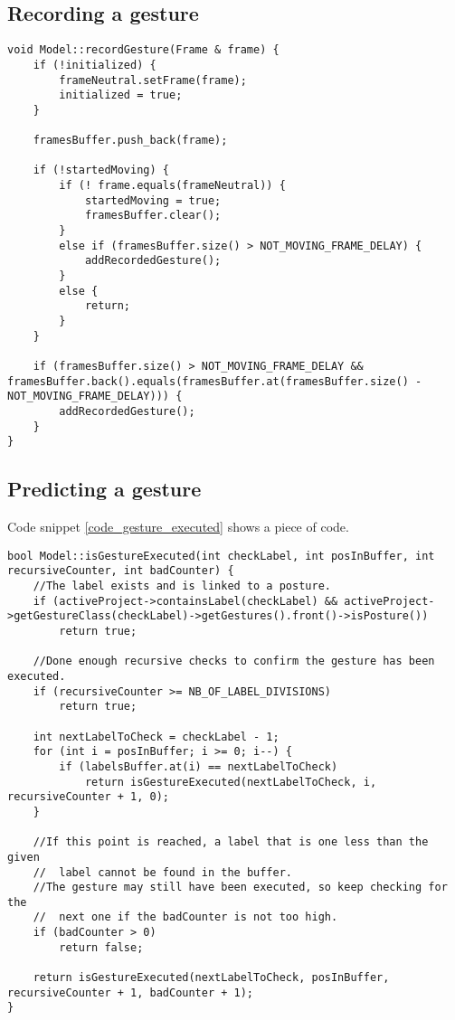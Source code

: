 \subsection{Recording a gesture}

\begin{lstlisting}[caption=method to record a gesture, label=code_record_gesture]
void Model::recordGesture(Frame & frame) {
	if (!initialized) {
		frameNeutral.setFrame(frame);
		initialized = true;
	}
	
	framesBuffer.push_back(frame);

	if (!startedMoving) {
		if (! frame.equals(frameNeutral)) {
			startedMoving = true;
			framesBuffer.clear();
		}
		else if (framesBuffer.size() > NOT_MOVING_FRAME_DELAY) {
			addRecordedGesture();
		}
		else {
			return;
		}
	}

	if (framesBuffer.size() > NOT_MOVING_FRAME_DELAY &&	framesBuffer.back().equals(framesBuffer.at(framesBuffer.size() - NOT_MOVING_FRAME_DELAY))) {
		addRecordedGesture();
	}
}
\end{lstlisting}


\subsection{Predicting a gesture}

Code snippet \ref{code_gesture_executed} shows a piece of code.

\begin{lstlisting}[caption=method to verify if a gesture with given label is executed, label=code_gesture_executed]
bool Model::isGestureExecuted(int checkLabel, int posInBuffer, int recursiveCounter, int badCounter) {
	//The label exists and is linked to a posture.
	if (activeProject->containsLabel(checkLabel) && activeProject->getGestureClass(checkLabel)->getGestures().front()->isPosture())
		return true;

	//Done enough recursive checks to confirm the gesture has been executed.
	if (recursiveCounter >= NB_OF_LABEL_DIVISIONS)
		return true;

	int nextLabelToCheck = checkLabel - 1;
	for (int i = posInBuffer; i >= 0; i--) {
		if (labelsBuffer.at(i) == nextLabelToCheck)
			return isGestureExecuted(nextLabelToCheck, i, recursiveCounter + 1, 0);
	}

	//If this point is reached, a label that is one less than the given
	//	label cannot be found in the buffer.
	//The gesture may still have been executed, so keep checking for the
	//	next one if the badCounter is not too high.
	if (badCounter > 0)
		return false;
		
	return isGestureExecuted(nextLabelToCheck, posInBuffer, recursiveCounter + 1, badCounter + 1);
}
\end{lstlisting}